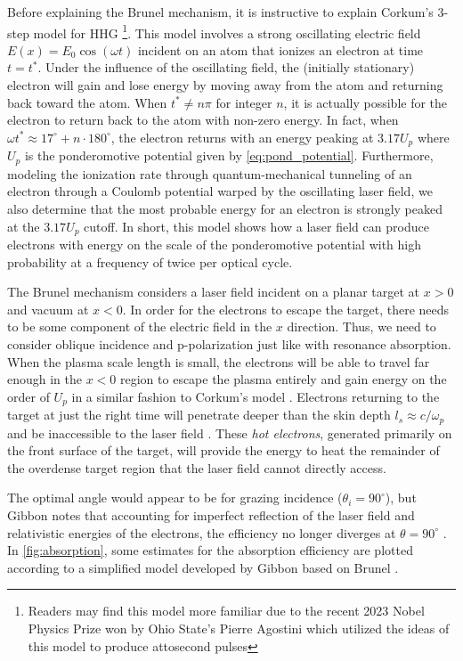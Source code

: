 Before explaining the Brunel mechanism, it is instructive to explain Corkum's 3-step model for \gls{HHG} \cite{Corkum_1993_PRL}\footnote{Readers may find this model more familiar due to the recent 2023 Nobel Physics Prize won by Ohio State's Pierre Agostini \cite{Nobel_2023} which utilized the ideas of this model to produce attosecond pulses}. This model involves a strong oscillating electric field $E(x) = E_0 \cos(\omega t)$ incident on an atom that ionizes an electron at time $t=t^*$. Under the influence of the oscillating field, the (initially stationary) electron will gain  and lose energy by moving away from the atom and returning back toward the atom. When $t^* \neq n \pi$ for integer $n$, it is actually possible for the electron to return back to the atom with non-zero energy. In fact, when $\omega t^* \approx 17^\circ + n \cdot 180^\circ$, the electron returns with an energy peaking at $3.17 U_p$ where $U_p$ is the ponderomotive potential given by \cref{eq:pond_potential}. Furthermore, modeling the ionization rate through quantum-mechanical tunneling of an electron through a Coulomb potential warped by the oscillating laser field, we also determine that the most probable energy for an electron is strongly peaked at the $3.17 U_p$ cutoff. In short, this model shows how a laser field can produce electrons with energy on the scale of the ponderomotive potential with high probability at a frequency of twice per optical cycle. 

The Brunel mechanism \cite{Brunel_1987_PRL} considers a laser field incident on a planar target at $x > 0$ and vacuum at $x < 0$. In order for the electrons to escape the target, there needs to be some component of the electric field in the $x$ direction. Thus, we need to consider oblique incidence and p-polarization just like with resonance absorption. When the plasma scale length is small, the electrons will be able to travel far enough in the $x < 0$ region to escape the plasma entirely and gain energy on the order of $U_p$ in a similar fashion to Corkum's model \cite{Corkum_1993_PRL}. Electrons returning to the target at just the right time will penetrate deeper than the skin depth $l_s \approx c / \omega_p$ and be inaccessible to the laser field \cite{Gibbon_2005_Plasma}. These \emph{hot electrons}, generated primarily on the front surface of the target, will provide the energy to heat the remainder of the overdense target region that the laser field cannot directly access. 

The optimal angle would appear to be for grazing incidence ($\theta_i = 90^\circ$), but Gibbon notes that accounting for imperfect reflection of the laser field and relativistic energies of the electrons, the efficiency no longer diverges at $\theta = 90^\circ$ \cite{Gibbon_2005_Plasma}. In \cref{fig:absorption}, some estimates for the absorption efficiency are plotted according to a simplified model developed by Gibbon \cite{Gibbon_2005_Plasma} based on Brunel \cite{Brunel_1987_PRL}.

